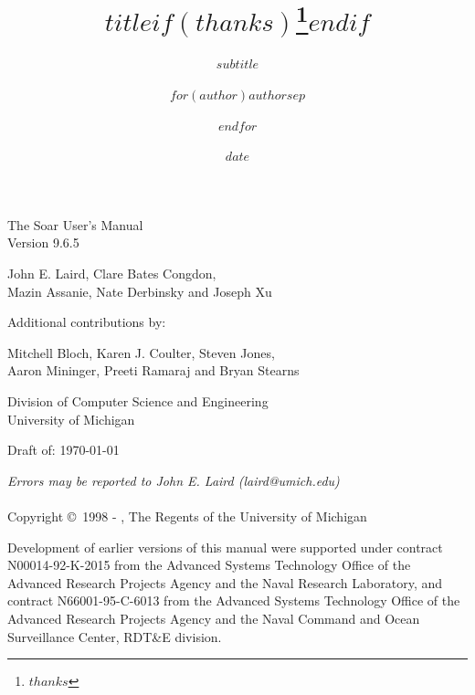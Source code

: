 \documentclass[12pt,a4paper]{article}
\title{$title$$if(thanks)$\thanks{$thanks$}$endif$}
\subtitle{$subtitle$}
\author{$for(author)$$author$$sep$ \and $endfor$}
\date{$date$}
\institute{$for(institute)$$institute$$sep$ \and $endfor$}
\newcommand{\SoarVersionMajor}{9}
\newcommand{\SoarVersionMinor}{6}
\newcommand{\SoarVersionRevision}{5}
\begin{document}
\begin{titlepage}
  \vspace{1.5in}

  \begin{center}
  \begin{huge}
    The Soar User's Manual \vspace{10pt} \\
    Version \SoarVersionMajor.\SoarVersionMinor.\SoarVersionRevision \vspace{20pt} \\
  \end{huge}
  \vspace{36pt}


  \begin{large}
      \vspace{20pt}
    John E. Laird, Clare Bates Congdon, \\
    Mazin Assanie, Nate Derbinsky and Joseph Xu  \\
      \vspace{20pt}
  \end{large}

    \vspace{20pt}
  \begin{large}
           Additional contributions by: \\
  \end{large}
      \vspace{10pt}
      Mitchell Bloch, Karen J. Coulter, Steven Jones, \\
      Aaron Mininger, Preeti Ramaraj and Bryan Stearns \\
      \vspace{20pt}
  \begin{large}
    Division of Computer Science and Engineering\\
    University of Michigan \vspace{.3in} \\
  \end{large}

    Draft of:
    \today

  \end{center}

  \vspace*{0pt plus 1filll}
    {\em
    Errors may be reported to John E. Laird (laird@umich.edu)\\
    \\
    }
    Copyright \copyright\ 1998 - \the\year, The Regents of the University of Michigan
  \vspace{.1in}

  Development of earlier versions of this manual were supported under
  contract N00014-92-K-2015 from the Advanced Systems Technology Office of
  the Advanced Research Projects Agency and the Naval Research Laboratory,
  and contract N66001-95-C-6013 from the Advanced Systems Technology
  Office of the Advanced Research Projects Agency and the Naval Command
  and Ocean Surveillance Center, RDT\&E division.

  \newpage
  \setlength{\parskip}{3pt}
  \normalsize
  \setlength{\parskip}{8pt}

  \end{titlepage}
\end{document}
